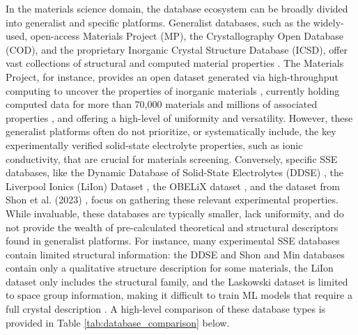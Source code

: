 \documentclass[a4paper,fleqn]{cas-sc}
\begin{document}
In the materials science domain, the database ecosystem can be broadly divided into generalist and specific platforms. Generalist databases, such as the widely-used, open-access Materials Project (MP), the Crystallography Open Database (COD), and the proprietary Inorganic Crystal Structure Database (ICSD), offer vast collections of structural and computed material properties \cite{armiento2020database}. The Materials Project, for instance, provides an open dataset generated via high-throughput computing to uncover the properties of inorganic materials \cite{jain2013commentary}, currently holding computed data for more than 70,000 materials and millions of associated properties \cite{ye2018harnessing}, and offering a high-level of uniformity and versatility. However, these generalist platforms often do not prioritize, or systematically include, the key experimentally verified solid-state electrolyte properties, such as ionic conductivity, that are crucial for materials screening. Conversely, specific SSE databases, like the Dynamic Database of Solid-State Electrolytes (DDSE) \cite{yang2024dynamic}, the Liverpool Ionics (LiIon) Dataset \cite{hargreaves2023database}, the OBELiX dataset \cite{therrien2025obelix}, and the dataset from Shon et al. (2023) \cite{shon2023extracting}, focus on gathering these relevant experimental properties. While invaluable, these databases are typically smaller, lack uniformity, and do not provide the wealth of pre-calculated theoretical and structural descriptors found in generalist platforms. For instance, many experimental SSE databases contain limited structural information: the DDSE and Shon and Min databases contain only a qualitative structure description for some materials, the LiIon dataset only includes the structural family, and the Laskowski dataset is limited to space group information, making it difficult to train ML models that require a full crystal description \cite{therrien2025obelix}. A high-level comparison of these database types is provided in Table \ref{tab:database_comparison} below.
\end{document}

